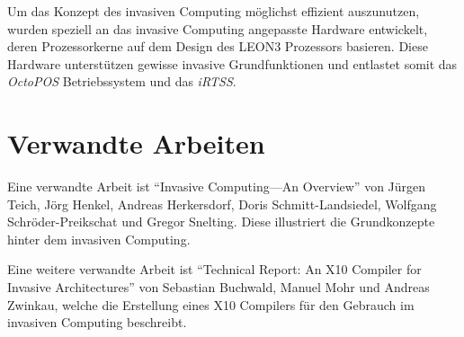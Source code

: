 Um das Konzept des invasiven Computing möglichst effizient auszunutzen, wurden speziell an das invasive Computing
angepasste Hardware entwickelt, deren Prozessorkerne auf dem Design des LEON3 Prozessors basieren.
Diese Hardware unterstützen gewisse invasive Grundfunktionen und entlastet somit das \textit{OctoPOS} Betriebssystem
und das \textit{iRTSS}.\cite{invasiveArrays}

\section{Verwandte Arbeiten}

Eine verwandte Arbeit ist "`Invasive Computing—An Overview"'\cite{invasiveOverview}
von Jürgen Teich, Jörg Henkel, Andreas Herkersdorf, Doris Schmitt-Landsiedel, Wolfgang Schröder-Preikschat
und Gregor Snelting. Diese illustriert die Grundkonzepte hinter dem invasiven Computing.

Eine weitere verwandte Arbeit ist "`Technical Report: An X10 Compiler for Invasive Architectures"'\cite{invasiveX10} 
von Sebastian Buchwald, Manuel Mohr und Andreas Zwinkau, welche die Erstellung eines X10 Compilers für den Gebrauch 
im invasiven Computing beschreibt.
